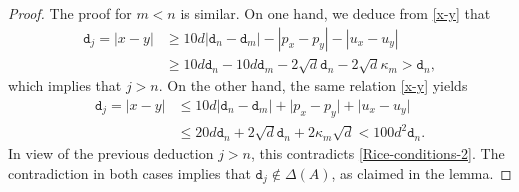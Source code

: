 \documentclass[a4paper,11pt]{amsart}
\numberwithin{equation}{section}
\begin{document}
\begin{proof}
\vskip0.1in
\noindent The proof for $m < n$ is similar. On one hand, we deduce from \eqref{x-y} that 
\begin{align*} \mathtt d_j = |x-y| &\geq 10d|\mathtt d_n - \mathtt d_m| - |p_x - p_y| - |u_x - u_y| \\ &\geq 10 d \mathtt d_n - 10d \mathtt d_{m} - 2 \sqrt{d} \mathtt d_n - 2 \sqrt{d} \kappa_m > \mathtt d_n, 
\end{align*} 
which implies that $j > n$. On the other hand, the same relation \eqref{x-y} yields
\begin{align*} 
\mathtt d_j = |x-y| &\leq 10d|\mathtt d_n - \mathtt d_m| + \bigl| p_x - p_y  \bigr| + \bigl| u_x - u_y  \bigr| \\ 
&\leq 20 d \mathtt d_n + 2 \sqrt{d} \mathtt d_n + 2 \kappa_m \sqrt{d} < 100 d^2 \mathtt d_n.  \end{align*} 
In view of the previous deduction $j > n$, this contradicts \eqref{Rice-conditions-2}. The contradiction in both cases implies that $\mathtt d_j \notin \Delta(A)$, as claimed in the lemma.    
\end{proof} 
\end{document}
